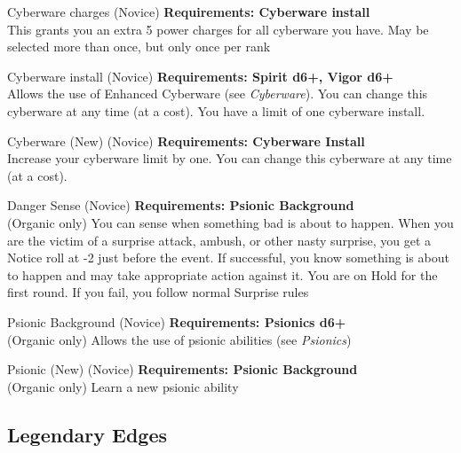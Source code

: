 \begin{multicols}{2}
\begin{genericsection}{Cyberware charges (Novice)}
\textbf{Requirements: Cyberware install}\\
This grants you an extra 5 power charges for all cyberware you have. May be selected more than once, but only once per rank
\end{genericsection}

\begin{genericsection}{Cyberware install (Novice)}
\textbf{Requirements: Spirit d6+, Vigor d6+}\\
Allows the use of Enhanced Cyberware (see \textit{Cyberware}). You can change this cyberware at any time (at a cost). You have a limit of one cyberware install.
\end{genericsection}

\begin{genericsection}{Cyberware (New) (Novice)}
\textbf{Requirements: Cyberware Install}\\
Increase your cyberware limit by one. You can change this cyberware at any time (at a cost).
\end{genericsection}

\begin{genericsection}{Danger Sense (Novice)}
\textbf{Requirements: Psionic Background}\\
(Organic only) You can sense when something bad is about to happen. When you are the victim of a surprise attack, ambush, or other nasty surprise, you get a Notice roll at -2 just before the event. If successful, you know something is about to happen and may take appropriate action against it. You are on Hold for the first round. If you fail, you follow normal Surprise rules
\end{genericsection}

\begin{genericsection}{Psionic Background (Novice)}
\textbf{Requirements: Psionics d6+}\\
(Organic only) Allows the use of psionic abilities (see \textit{Psionics})
\end{genericsection}

\begin{genericsection}{Psionic (New) (Novice)}
\textbf{Requirements: Psionic Background}\\
(Organic only) Learn a new psionic ability
\end{genericsection}

%
%
\subsection{Legendary Edges}


\end{multicols}
